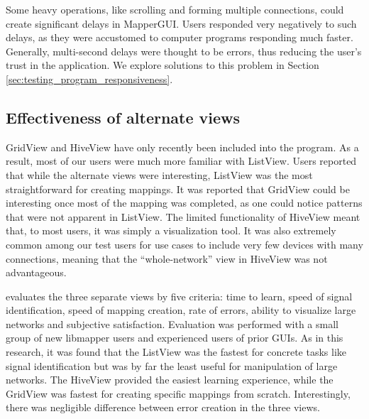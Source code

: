 Some heavy operations, like scrolling and forming multiple connections, could create significant delays in MapperGUI. Users responded very negatively to such delays, as they were accustomed to computer programs responding much faster. Generally, multi-second delays were thought to be errors, thus reducing the user's trust in the application. We explore solutions to this problem in Section \ref{sec:testing_program_responsiveness}.
	

	\subsection{Effectiveness of alternate views} %
	\label{sub:effectiveness_of_alternate_views}

GridView and HiveView have only recently been included into the program. As a result, most of our users were much more familiar with ListView. Users reported that while the alternate views were interesting, ListView was the most straightforward for creating mappings. It was reported that GridView could be interesting once most of the mapping was completed, as one could notice patterns that were not apparent in ListView. The limited functionality of HiveView meant that, to most users, it was simply a visualization tool. It was also extremely common among our test users for use cases to include very few devices with many connections, meaning that the ``whole-network'' view in HiveView was not advantageous.

 evaluates the three separate views by five criteria: time to learn, speed of signal identification, speed of mapping creation, rate of errors, ability to visualize large networks and subjective satisfaction. Evaluation was performed with a small group of new libmapper users and experienced users of prior GUIs. As in this research, it was found that the ListView was the fastest for concrete tasks like signal identification but was by far the least useful for manipulation of large networks. The HiveView provided the easiest learning experience, while the GridView was fastest for creating specific mappings from scratch. Interestingly, there was negligible difference between error creation in the three views.
	
	

